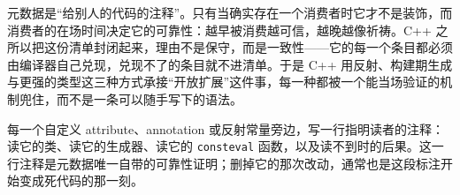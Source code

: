 \documentclass[12pt,a4paper,fontset=fandol]{ctexbook}
\newcommand{\cpp}[1]{C++#1}
\begin{document}
\begin{guideline}[title={全册的反直觉结论}]
元数据是“给别人的代码的注释”。只有当确实存在一个消费者时它才不是装饰，而消费者的在场时间决定它的可靠性：越早被消费越可信，越晚越像祈祷。\cpp{} 之所以把这份清单封闭起来，理由不是保守，而是一致性——它的每一个条目都必须由编译器自己兑现，兑现不了的条目就不进清单。于是 \cpp{} 用反射、构建期生成与更强的类型这三种方式承接“开放扩展”这件事，每一种都被一个能当场验证的机制兜住，而不是一条可以随手写下的语法。
\end{guideline}

\begin{bestpractice}[title={把“谁在读”写成一行注释}]
每一个自定义 attribute、annotation 或反射常量旁边，写一行指明读者的注释：读它的类、读它的生成器、读它的 \texttt{consteval} 函数，以及读不到时的后果。这一行注释是元数据唯一自带的可靠性证明；删掉它的那次改动，通常也是这段标注开始变成死代码的那一刻。
\end{bestpractice}
\end{document}
